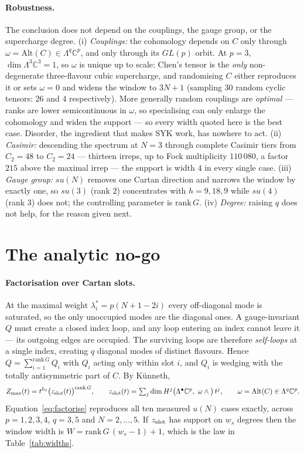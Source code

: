 \documentclass[10pt]{article}
\newcommand{\rank}{\mathrm{rank}\,}
\begin{document}
\paragraph{Robustness.}
The conclusion does not depend on the couplings, the gauge group, or the supercharge degree. (i) \emph{Couplings:} the cohomology depends on $C$ only through $\omega=\mathrm{Alt}(C)\in\Lambda^q\mathbb C^p$, and only through its $GL(p)$ orbit. At $p=3$, $\dim\Lambda^3\mathbb C^3=1$, so $\omega$ is unique up to scale: Chen's tensor is the \emph{only} non-degenerate three-flavour cubic supercharge, and randomising $C$ either reproduces it or sets $\omega=0$ and widens the window to $3N+1$ (sampling $30$ random cyclic tensors: $26$ and $4$ respectively). More generally random couplings are \emph{optimal} --- ranks are lower semicontinuous in $\omega$, so specialising can only enlarge the cohomology and widen the support --- so every width quoted here is the best case. Disorder, the ingredient that makes SYK work, has nowhere to act. (ii) \emph{Casimir:} descending the spectrum at $N=3$ through complete Casimir tiers from $C_2=48$ to $C_2=24$ --- thirteen irreps, up to Fock multiplicity $110\,080$, a factor $215$ above the maximal irrep --- the support is width $4$ in every single case. (iii) \emph{Gauge group:} $su(N)$ removes one Cartan direction and narrows the window by exactly one, so $su(3)$ (rank $2$) concentrates with $h=9,18,9$ while $su(4)$ (rank $3$) does not; the controlling parameter is $\rank G$. (iv) \emph{Degree:} raising $q$ does not help, for the reason given next.

\section{The analytic no-go}\label{sec:analytic}

\paragraph{Factorisation over Cartan slots.}
At the maximal weight $\lambda^*_i=p(N+1-2i)$ every off-diagonal mode is saturated, so the only unoccupied modes are the diagonal ones. A gauge-invariant $Q$ must create a closed index loop, and any loop entering an index cannot leave it --- its outgoing edges are occupied. The surviving loops are therefore \emph{self-loops} at a single index, creating $q$ diagonal modes of distinct flavours. Hence $Q=\sum_{i=1}^{\rank G}Q_i$ with $Q_i$ acting only within slot $i$, and $Q_i$ is wedging with the totally antisymmetric part of $C$. By K\"unneth,
\begin{equation}
Z_{\max}(t)=t^{k_0}\big(z_{\rm slot}(t)\big)^{\rank G},\qquad
z_{\rm slot}(t)=\textstyle\sum_j\dim H^j\big(\Lambda^\bullet\mathbb C^p,\ \omega\wedge\big)\,t^j,\qquad \omega=\mathrm{Alt}(C)\in\Lambda^q\mathbb C^p .
\label{eq:factorise}
\end{equation}
Equation~\eqref{eq:factorise} reproduces all ten measured $u(N)$ cases exactly, across $p=1,2,3,4$, $q=3,5$ and $N=2,\dots,5$. If $z_{\rm slot}$ has support on $w_s$ degrees then the window width is $W=\rank G\,(w_s-1)+1$, which is the law in Table~\ref{tab:widths}.
\end{document}
